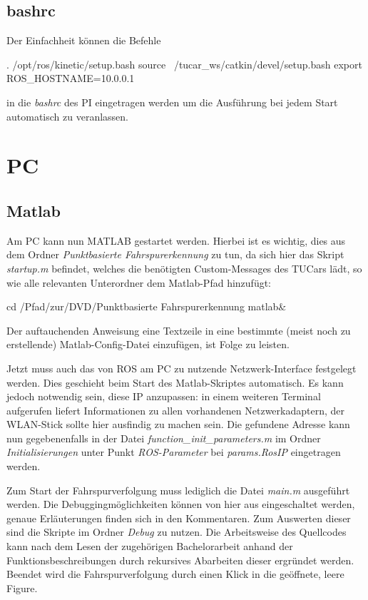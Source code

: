 \documentclass[
	11pt,			%
	a4paper,		%
	oneside,		%
	german,			%
	titlepage		%
]{scrartcl}			%
\newcommand{\sh}[1]{\mint[xleftmargin=2em]{shell}{#1}}
\begin{document}
\subsection{bashrc}
Der Einfachheit können die Befehle
\begin{she}
. /opt/ros/kinetic/setup.bash
source ~/tucar_ws/catkin/devel/setup.bash
export ROS_HOSTNAME=10.0.0.1
\end{she}
\noindent in die \emph{bashrc} des PI eingetragen werden um die Ausführung bei jedem Start automatisch zu veranlassen.

\section{PC}
\subsection{Matlab}
\label{ssec:pc:matlab}
Am PC kann nun MATLAB gestartet werden. Hierbei ist es wichtig, dies aus dem Ordner \emph{Punktbasierte Fahrspurerkennung} zu tun, da sich hier das Skript \emph{startup.m} befindet, welches die benötigten Custom-Messages des TUCars lädt, so wie alle relevanten Unterordner dem Matlab-Pfad hinzufügt:
\begin{she}
cd /Pfad/zur/DVD/Punktbasierte Fahrspurerkennung
matlab&
\end{she}
Der auftauchenden Anweisung eine Textzeile in eine bestimmte (meist noch zu erstellende) Matlab-Config-Datei einzufügen, ist Folge zu leisten. 

Jetzt muss auch das von ROS am PC zu nutzende Netzwerk-Interface festgelegt werden. Dies geschieht beim Start des Matlab-Skriptes automatisch. Es kann jedoch notwendig sein, diese IP anzupassen:
\sh{ifconfig} 
\noindent in einem weiteren Terminal aufgerufen liefert Informationen zu allen vorhandenen Netzwerkadaptern, der WLAN-Stick sollte hier ausfindig zu machen sein.
Die gefundene Adresse kann nun gegebenenfalls in der Datei \emph{function\_init\_parameters.m} im Ordner \emph{Initialisierungen} unter Punkt \emph{ROS-Parameter} bei \emph{params.RosIP} eingetragen werden.

Zum Start der Fahrspurverfolgung muss lediglich die Datei \emph{main.m} ausgeführt werden. Die Debuggingmöglichkeiten können von hier aus eingeschaltet werden, genaue Erläuterungen finden sich in den Kommentaren. Zum Auswerten dieser sind die Skripte im Ordner \emph{Debug} zu nutzen. Die Arbeitsweise des Quellcodes kann nach dem Lesen der zugehörigen Bachelorarbeit anhand der Funktionsbeschreibungen durch rekursives Abarbeiten dieser ergründet werden. Beendet wird die Fahrspurverfolgung durch einen Klick in die geöffnete, leere Figure.
\end{document}
